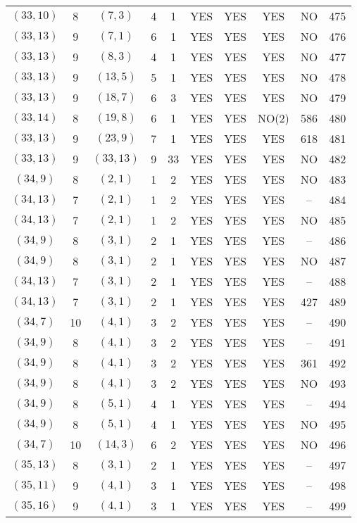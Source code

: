 \begin{longtable}{|c|c|c|c|c|c|c|c|c|c|}
$(33, 10)$ & 8 & $(7, 3)$ & 4 & 1 & YES & YES & YES & NO & 475\\
$(33, 13)$ & 9 & $(7, 1)$ & 6 & 1 & YES & YES & YES & NO & 476\\
$(33, 13)$ & 9 & $(8, 3)$ & 4 & 1 & YES & YES & YES & NO & 477\\
$(33, 13)$ & 9 & $(13, 5)$ & 5 & 1 & YES & YES & YES & NO & 478\\
$(33, 13)$ & 9 & $(18, 7)$ & 6 & 3 & YES & YES & YES & NO & 479\\
$(33, 14)$ & 8 & $(19, 8)$ & 6 & 1 & YES & YES & NO(2) & 586 & 480\\
$(33, 13)$ & 9 & $(23, 9)$ & 7 & 1 & YES & YES & YES & 618 & 481\\
$(33, 13)$ & 9 & $(33, 13)$ & 9 & 33 & YES & YES & YES & NO & 482\\
$(34, 9)$ & 8 & $(2, 1)$ & 1 & 2 & YES & YES & YES & NO & 483\\
$(34, 13)$ & 7 & $(2, 1)$ & 1 & 2 & YES & YES & YES & -- & 484\\
$(34, 13)$ & 7 & $(2, 1)$ & 1 & 2 & YES & YES & YES & NO & 485\\
$(34, 9)$ & 8 & $(3, 1)$ & 2 & 1 & YES & YES & YES & -- & 486\\
$(34, 9)$ & 8 & $(3, 1)$ & 2 & 1 & YES & YES & YES & NO & 487\\
$(34, 13)$ & 7 & $(3, 1)$ & 2 & 1 & YES & YES & YES & -- & 488\\
$(34, 13)$ & 7 & $(3, 1)$ & 2 & 1 & YES & YES & YES & 427 & 489\\
$(34, 7)$ & 10 & $(4, 1)$ & 3 & 2 & YES & YES & YES & -- & 490\\
$(34, 9)$ & 8 & $(4, 1)$ & 3 & 2 & YES & YES & YES & -- & 491\\
$(34, 9)$ & 8 & $(4, 1)$ & 3 & 2 & YES & YES & YES & 361 & 492\\
$(34, 9)$ & 8 & $(4, 1)$ & 3 & 2 & YES & YES & YES & NO & 493\\
$(34, 9)$ & 8 & $(5, 1)$ & 4 & 1 & YES & YES & YES & -- & 494\\
$(34, 9)$ & 8 & $(5, 1)$ & 4 & 1 & YES & YES & YES & NO & 495\\
$(34, 7)$ & 10 & $(14, 3)$ & 6 & 2 & YES & YES & YES & NO & 496\\
$(35, 13)$ & 8 & $(3, 1)$ & 2 & 1 & YES & YES & YES & -- & 497\\
$(35, 11)$ & 9 & $(4, 1)$ & 3 & 1 & YES & YES & YES & -- & 498\\
$(35, 16)$ & 9 & $(4, 1)$ & 3 & 1 & YES & YES & YES & -- & 499\\

\end{longtable}
